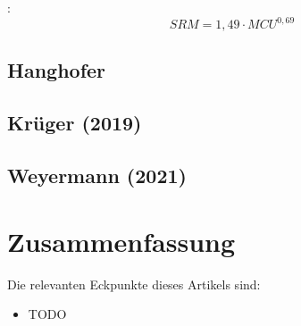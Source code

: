 \documentclass[a4paper,parskip=half]{scrartcl}
\newcommand{\MCU}{\mathit{MCU}}
\newcommand{\SRM}{\mathit{SRM}}
\begin{document}
\parencite{Morey}:
\begin{equation}
\SRM = 1,49 \cdot \MCU^{0,69}
\label{eq:mcumorey}
\end{equation}



\parencite{Morey}
\parencite{Smith2010}

\subsection*{Hanghofer}

\parencite[78]{Hanghofer2019}

\subsection*{Krüger (2019)}

\subsection*{Weyermann (2021)}

\section*{Zusammenfassung}


\parencite{Bruecklmeier2018}
\parencite{Holle2010}

\parencite{Smith2008}
\parencite{Bies2010}
\parencite{Tucker2017}

\parencite{KrausWeyermann2021a}
\parencite{KrausWeyermann2021b}
\parencite{KrausWeyermann2021c}

\parencite{Lange2016}
\parencite{Caro2019}
\parencite{Daniels2012}

Die relevanten Eckpunkte dieses Artikels sind:

\begin{itemize}
\item TODO
\end{itemize}

\printbibliography[title=Quellen]
\end{document}
